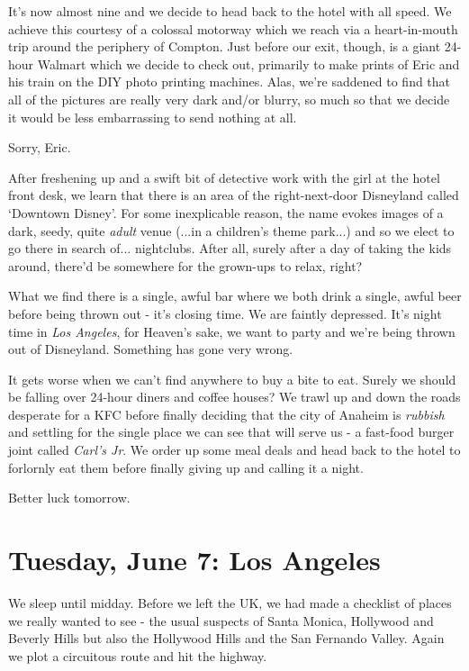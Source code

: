 \documentclass[a5paper,titlepage,11pt]{book}
\begin{document}
It's now almost nine and we decide to head back to the hotel with all speed.  We achieve this courtesy of a colossal motorway which we reach via a heart-in-mouth trip around the periphery of Compton.  Just before our exit, though, is a giant 24-hour Walmart which we decide to check out, primarily to make prints of Eric and his train on the DIY photo printing machines.  Alas, we're saddened to find that all of the pictures are really very dark and/or blurry, so much so that we decide it would be less embarrassing to send nothing at all.

Sorry, Eric.

After freshening up and a swift bit of detective work with the girl at the hotel front desk, we learn that there is an area of the right-next-door Disneyland called `Downtown Disney'.  For some inexplicable reason, the name evokes images of a dark, seedy, quite \emph{adult} venue (...in a children's theme park...) and so we elect to go there in search of... nightclubs.  After all, surely after a day of taking the kids around, there'd be somewhere for the grown-ups to relax, right?

What we find there is a single, awful bar where we both drink a single, awful beer before being thrown out - it's closing time.  We are faintly depressed.  It's night time in \emph{Los Angeles}, for Heaven's sake, we want to party and we're being thrown out of Disneyland.  Something has gone very wrong.

It gets worse when we can't find anywhere to buy a bite to eat.  Surely we should be falling over 24-hour diners and coffee houses?  We trawl up and down the roads desperate for a KFC before finally deciding that the city of Anaheim is \emph{rubbish} and settling for the single place we can see that will serve us - a fast-food burger joint called \emph{Carl's Jr}.  We order up some meal deals and head back to the hotel to forlornly eat them before finally giving up and calling it a night.

Better luck tomorrow.

\chapter[Los Angeles]{Tuesday, June 7:  Los Angeles}
We sleep until midday.  Before we left the UK, we had made a checklist of places we really wanted to see - the usual suspects of Santa Monica, Hollywood and Beverly Hills but also the Hollywood Hills and the San Fernando Valley.  Again we plot a circuitous route and hit the highway.
\end{document}
